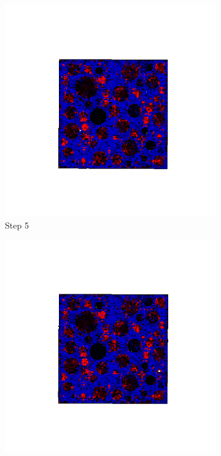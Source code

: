 \begin{figure}[ht!]
      \begin{subfigure}{.25\textwidth}
        \centering
        \includegraphics[width=1.0\linewidth]{Files//A30P75_3_IS/DEP50-STEP(005).png}
      \caption{Step 5}
      \end{subfigure}%
      \begin{subfigure}{.25\textwidth}
        \centering
        \includegraphics[width=1.0\linewidth]{Files/A30P75_3_IS/DEP50-STEP(006).png}

\end{subfigure}
\end{figure}
